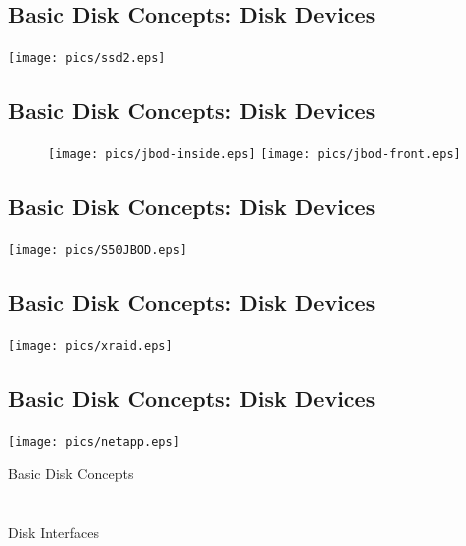 \documentclass[xga]{xdvislides}
\begin{document}
\subsection{Basic Disk Concepts: Disk Devices}
	\begin{center}
		\texttt{[image: pics/ssd2.eps]} \\
	\end{center}

\subsection{Basic Disk Concepts: Disk Devices}
\begin{figure}[hb]
	\begin{center}
		\texttt{[image: pics/jbod-inside.eps]}
		\hspace*{15mm}
		\texttt{[image: pics/jbod-front.eps]} \\
	\end{center}
\end{figure}


\subsection{Basic Disk Concepts: Disk Devices}
\vfill
	\begin{center}
		\texttt{[image: pics/S50JBOD.eps]} \\
	\end{center}
\vfill

\subsection{Basic Disk Concepts: Disk Devices}
	\begin{center}
		\texttt{[image: pics/xraid.eps]} \\
	\end{center}


\subsection{Basic Disk Concepts: Disk Devices}
	\begin{center}
		\texttt{[image: pics/netapp.eps]} \\
	\end{center}

\newpage
\vspace*{\fill}
\begin{center}
	\Hugesize
		Basic Disk Concepts \\ [1em]
	\hspace*{5mm}
	\blueline\\
	\hspace*{5mm}\\
		Disk Interfaces
\end{center}
\vspace*{\fill}
\end{document}
